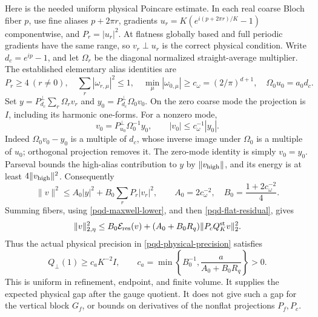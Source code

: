 Here is the needed uniform physical Poincare estimate. In each real
coarse Bloch fiber $p$, use fine aliases $p+2\pi r$, gradients
$u_r=K(e^{i(p+2\pi r)/K}-1)$ componentwise, and $P_r=|u_r|^2$.
At flatness globally based and full periodic gradients have the same
range, so $v_r\perp u_r$ is the correct physical condition. Write
$d_c=e^{ip}-1$, and let $\Omega_r$ be the diagonal normalized
straight-average multiplier. The established elementary alias identities
are
\begin{equation}
 P_r\ge4\ (r\ne0),\quad
 \sum_r|\omega_{r,\mu}|^2\le1,\quad
 \min_\mu|\omega_{0,\mu}|\ge c_\omega=(2/\pi)^{d+1},
 \quad \Omega_0u_0=a_0d_c.
 \label{pqd-alias-inputs}
\end{equation}
Set $y=P_{d_c}^{\perp}\sum_r\Omega_rv_r$ and
$y_0=P_{d_c}^{\perp}\Omega_0v_0$. On the zero coarse mode the projection
is $I$, including its harmonic one-forms. For a nonzero mode,
\begin{equation}
 v_0=P_{u_0}^{\perp}\Omega_0^{-1}y_0,
 \qquad |v_0|\le c_\omega^{-1}|y_0|.
 \label{pqd-central-inverse}
\end{equation}
Indeed $\Omega_0v_0-y_0$ is a multiple of $d_c$, whose inverse image
under $\Omega_0$ is a multiple of $u_0$; orthogonal projection removes
it. The zero-mode identity is simply $v_0=y_0$.
Parseval bounds the high-alias contribution to $y$ by $\|v_{\rm high}\|$,
and its energy is at least $4\|v_{\rm high}\|^2$. Consequently
\begin{equation}
 \|v\|^2\le A_0|y|^2+B_0\sum_rP_r|v_r|^2,
 \qquad A_0=2c_\omega^{-2},\quad
 B_0=\frac{1+2c_\omega^{-2}}4.
 \label{pqd-physical-poincare}
\end{equation}
Summing fibers, using \eqref{pqd-maxwell-lower}, and then
\eqref{pqd-flat-residual}, gives
\begin{equation}
 \|v\|_{2,\eta}^2\le B_0\mathcal E_{\rm res}(v)
 +(A_0+B_0R_q)\|P_cQ_K^{\rm st}v\|_2^2.
 \label{pqd-residual-poincare}
\end{equation}
Thus the actual physical precision in \eqref{pqd-physical-precision}
satisfies
\begin{equation}
 \boxed{\displaystyle Q_\perp(1)\ge c_a K^{-2}I,\qquad
 c_a=\min\left\{B_0^{-1},\frac{a}{A_0+B_0R_q}\right\}>0.}
 \label{pqd-flat-gap}
\end{equation}
This is uniform in refinement, endpoint, and finite volume. It supplies
the expected physical gap after the gauge quotient. It does not give
such a gap for the vertical block $G_f$, or bounds on derivatives of
the nonflat projections $P_f,P_c$.

